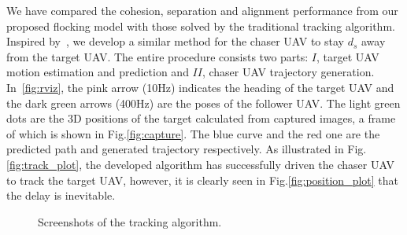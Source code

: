 We have compared the cohesion, separation and alignment performance from our proposed flocking model with those solved by the traditional tracking algorithm. Inspired by~\cite{Chenjing}, we develop a similar method for the chaser UAV to stay $d_s$ away from the target UAV. The entire procedure consists two parts: $\mathit{I}$, target UAV motion estimation and prediction and $\mathit{II}$, chaser UAV trajectory generation. In~\ref{fig:rviz}, the pink arrow (10Hz) indicates the heading of the target UAV and the dark green arrows (400Hz) are the poses of the follower UAV. The light green dots are the 3D positions of the target calculated from captured images, a frame of which is shown in Fig.\ref{fig:capture}. The blue curve and the red one are the predicted path and generated trajectory respectively. As illustrated in Fig.\ref{fig:track_plot}, the developed algorithm has successfully driven the chaser UAV to track the target UAV, however, it is clearly seen in Fig.\ref{fig:position_plot} that the delay is inevitable.

\begin{figure}[htb]
  \centering
  \caption{Screenshots of the tracking algorithm.}\label{fig:rviz_capture}
\end{figure}

